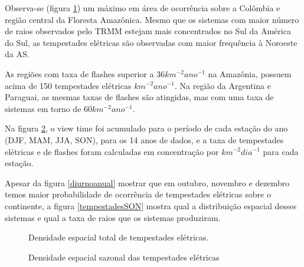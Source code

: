 Observa-se (figura \ref{tempestadesTotal}) um máximo em área de ocorrência sobre a Colômbia e região central da Floresta Amazônica. Mesmo que os sistemas com maior número de raios observados pelo TRMM estejam mais concentrados no Sul da América do Sul, as tempestades elétricas são observadas com maior frequência à Noroeste da AS. 

As regiões com taxa de flashes superior a 36$km^{-2}ano^{-1}$ na Amazônia, possuem acima de 150 tempestades elétricas $km^{-2}ano^{-1}$. Na região da Argentina e Paraguai, as mesmas taxas de flashes são atingidas, mas com uma taxa de sistemas em torno de 60$km^{-2}ano^{-1}$.  

Na figura \ref{DensidadeTempestadesSazonal}, o view time foi acumulado para o período de cada estação do ano (DJF, MAM, JJA, SON), para os 14 anos de dados, e a taxa de tempestades elétricas e de flashes foram calculadas em concentração por $km^{-2}dia^{-1}$ para cada estação. 

Apesar da figura \ref{diurnoanual} mostrar que em outubro, novembro e dezembro temos maior probabilidade de ocorrência de tempestades elétricas sobre o continente, a figura \ref{tempestadesSON} mostra qual a distribuição espacial desses sistemas e qual a taxa de raios que os sistemas produziram. 


\begin{figure}
\caption{Densidade espacial total de tempestades elétricas.}
\label{tempestadesTotal}
\end{figure}

\begin{figure}
  \caption{Densidade espacial sazonal das tempestades elétricas}
\label{DensidadeTempestadesSazonal}
\end{figure} 

